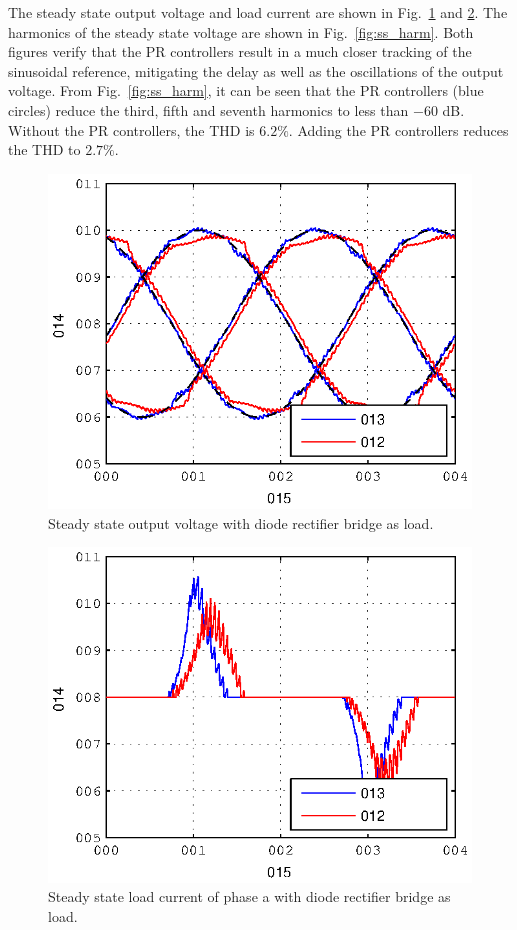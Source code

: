 \documentclass[conference,10pt]{IEEEtran}
\begin{document}
The steady state output voltage and load current are shown in Fig.~\ref{fig:ss_vc} and \ref{fig:ss_iload}. The harmonics of the steady state voltage are shown in Fig.~\ref{fig:ss_harm}. Both figures verify that the PR controllers result in a much closer tracking of the sinusoidal reference, mitigating the delay as well as the oscillations of the output voltage. From Fig.~\ref{fig:ss_harm}, it can be seen that the PR controllers (blue circles) reduce the third, fifth and seventh harmonics to less than $-60$ dB.
Without the PR controllers, the THD is $6.2 \%$. Adding the PR controllers reduces the THD to $2.7 \%$.
\begin{figure}[!h]
\centering

\includegraphics{fig/steady_state_vCf}
\caption{Steady state output voltage with diode rectifier bridge as load.}
\label{fig:ss_vc}
\end{figure}
\begin{figure}[!h]
\centering

\includegraphics{fig/steady_state_iLoad}
\caption{Steady state load current of phase a with diode rectifier bridge as load.}
\label{fig:ss_iload}
\end{figure}
\end{document}
